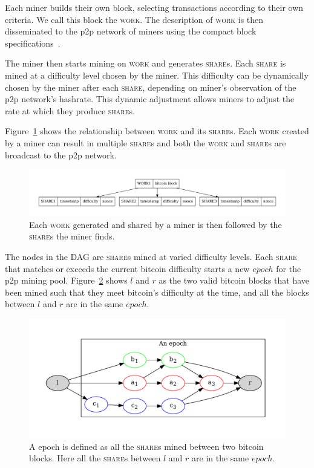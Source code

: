 \documentclass{article}
\begin{document}
Each miner builds their own block, selecting transactions according to
their own criteria. We call this block the \textsc{work}. The
description of \textsc{work} is then disseminated to the p2p network
of miners using the compact block
specifications~\cite{compact-blocks}.

The miner then starts mining on \textsc{work} and generates
\textsc{share}s. Each \textsc{share} is mined at a difficulty level
chosen by the miner. This difficulty can be dynamically chosen by the
miner after each \textsc{share}, depending on miner's observation of
the p2p network's hashrate. This dynamic adjustment allows miners to
adjust the rate at which they produce \textsc{share}s.

Figure~\ref{fig:work-share} shows the relationship between
\textsc{work} and its \textsc{share}s. Each \textsc{work} created by a
miner can result in multiple \textsc{share}s and both the
\textsc{work} and \textsc{share}s are broadcast to the p2p network.

\begin{figure}
  \begin{center}
    \includegraphics[width=1.0\textwidth]{work-share}
    \caption{Each \textsc{work} generated and shared by a miner is then
      followed by the \textsc{share}s the miner finds.}\label{fig:work-share}
    \end{center}
\end{figure}

The nodes in the DAG are \textsc{share}s mined at varied difficulty
levels. Each \textsc{share} that matches or exceeds the current
bitcoin difficulty starts a new $epoch$ for the p2p mining
pool. Figure~\ref{fig:epoch} shows $l$ and $r$ as the two valid
bitcoin blocks that have been mined such that they meet bitcoin's
difficulty at the time, and all the blocks between $l$ and $r$ are in
the same $epoch$.

\begin{figure}
  \includegraphics[width=1.0\textwidth]{epoch}
  \caption{A epoch is defined as all the \textsc{share}s mined between two
    bitcoin blocks. Here all the \textsc{share}s between $l$ and $r$ are in
    the same $epoch$.}\label{fig:epoch}
\end{figure}
\end{document}
